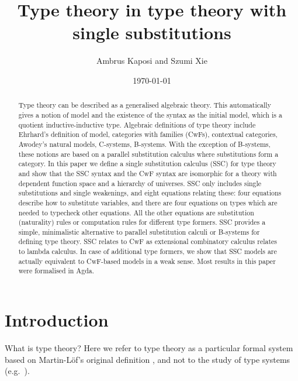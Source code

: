 \documentclass[sigplan,10pt,anonymous,review]{acmart}\settopmatter{printfolios=true,printccs=false,printacmref=false}
\begin{document}
\newtheorem{problem}[theorem]{Problem}
\theoremstyle{remark}
\newtheorem{construction}[theorem]{Construction}

\title{Type theory in type theory with single substitutions}
\author{Ambrus Kaposi and Szumi Xie}
\date{\today}

\begin{abstract}
Type theory can be described as a generalised algebraic theory. This
automatically gives a notion of model and the existence of the syntax
as the initial model, which is a quotient inductive-inductive
type. Algebraic definitions of type theory include Ehrhard's
definition of model, categories with families (CwFs), contextual
categories, Awodey's natural models, C-systems, B-systems. With the
exception of B-systems, these notions are based on a parallel
substitution calculus where substitutions form a category. In this
paper we define a single substitution calculus (SSC) for type theory
and show that the SSC syntax and the CwF syntax are isomorphic for a
theory with dependent function space and a hierarchy of universes. SSC
only includes single substitutions and single weakenings, and eight
equations relating these: four equations describe how to substitute
variables, and there are four equations on types which are needed to
typecheck other equations. All the other equations are substitution
(naturality) rules or computation rules for different type
formers. SSC provides a simple, minimalistic alternative to parallel
substitution calculi or B-systems for defining type theory. SSC
relates to CwF as extensional combinatory calculus relates to lambda
calculus. In case of additional type formers, we show that SSC models
are actually equivalent to CwF-based models in a weak sense. Most
results in this paper were formalised in Agda.
\end{abstract}

\maketitle

\section{Introduction}

What is type theory? Here we refer to type theory as a particular
formal system based on Martin-Löf's original definition
\cite{martinlof73predicative}, and not to the study of type systems
(e.g.\ \cite{DBLP:books/daglib/0005958}).
\end{document}
